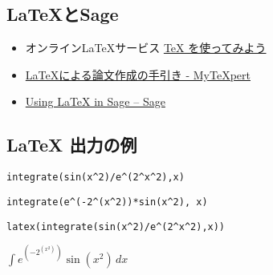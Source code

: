 \documentclass[dvipdfmx,11pt]{jarticle}
\begin{document}
\subsection{\LaTeX{}とSage}
\label{sec:org1c0aeb9}

\begin{itemize}
\item オンライン\LaTeX{}サービス  \href{https://oku.edu.mie-u.ac.jp/\~okumura/texonweb/}{\TeX{} を使ってみよう}

\item \href{https://mytexpert.osdn.jp/index.php?LaTeX\%A4\%CB\%A4\%E8\%A4\%EB\%CF\%C0\%CA\%B8\%BA\%EE\%C0\%AE\%A4\%CE\%BC\%EA\%B0\%FA\%A4\%AD}{\LaTeX{}による論文作成の手引き - MyTeXpert}

\item \href{http://sage.math.gordon.edu/home/pub/51/}{Using \LaTeX{} in Sage -- Sage}
\end{itemize}

\subsection{\LaTeX{} 出力の例}
\label{sec:org2f9514c}


\begin{verbatim}
integrate(sin(x^2)/e^(2^x^2),x)
\end{verbatim}
\begin{center}


\begin{verbatim}
integrate(e^(-2^(x^2))*sin(x^2), x)
\end{verbatim}

\begin{verbatim}
latex(integrate(sin(x^2)/e^(2^x^2),x))

\end{verbatim}




\(\int e^{\left(-2^{\left(x^{2}\right)}\right)}\sin\left(x^{2}\right)\,{d x}\)
\end{center}
\end{document}
